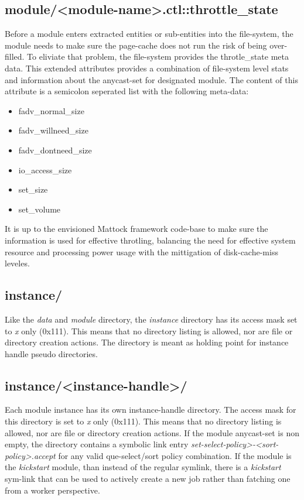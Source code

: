 \subsection{module/<module-name>.ctl::throttle\_state}
Before a module enters extracted entities or sub-entities into the file-system, the module needs to make sure the page-cache does not run the risk of being over-filled. To eliviate that problem, the file-system provides the throtle\_state meta data. This extended attributes provides a combination of file-system level stats and information about the anycast-set for designated module. The content of this attribute is a semicolon seperated list with the following meta-data:
\begin{itemize}
\item fadv\_normal\_size
\item fadv\_willneed\_size
\item fadv\_dontneed\_size
\item io\_access\_size
\item set\_size
\item set\_volume
\end{itemize}
It is up to the envisioned Mattock framework code-base to make sure the information is used for effective throtling, balancing the need for effective system resource and processing power usage with the mittigation of disk-cache-miss leveles.
\subsection{instance/}
Like the \emph{data} and \emph{module} directory, the \emph{instance} directory  has its access mask set to \emph{x} only (0x111). This means that no directory listing is allowed, nor are file or directory creation actions. The directory is meant as holding point for instance handle pseudo directories.
\subsection{instance/<instance-handle>/}
Each module instance has its own instance-handle directory. The  access mask for this directory is set to \emph{x} only (0x111).  This means that no directory listing is allowed, nor are file or directory creation actions. If the module anycast-set is non empty, the directory contains a symbolic link entry \emph{set-select-policy>-<sort-policy>.accept} for any valid que-select/sort policy combination. If the module is the \emph{kickstart} module, than instead of the regular symlink, there is a \emph{kickstart} sym-link that can be used to actively create a new job rather than fatching one from a worker perspective.

